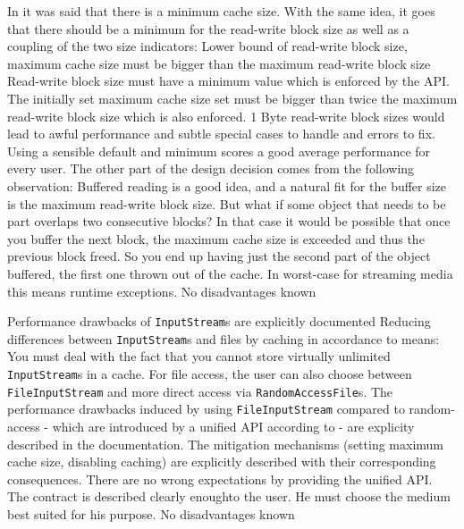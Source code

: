 In  it was said that there is a minimum cache size. With the same idea, it goes that there should be a minimum for the read-write block size as well as a coupling of the two size indicators:
{%
Lower bound of read-write block size, maximum cache size must be bigger than the maximum read-write block size
}
{%
Read-write block size must have a minimum value which is enforced by the API. The initially set maximum cache size set must be bigger than twice the maximum read-write block size which is also enforced.
}
{%
1 Byte read-write block sizes would lead to awful performance and subtle special cases to handle and errors to fix. Using a sensible default and minimum scores a good average performance for every user. The other part of the design decision comes from the following observation: Buffered reading is a good idea, and a natural fit for the buffer size is the maximum read-write block size. But what if some object that needs to be part overlaps two consecutive blocks? In that case it would be possible that once you buffer the next block, the maximum cache size is exceeded and thus the previous block freed. So you end up having just the second part of the object buffered, the first one thrown out of the cache. In worst-case for streaming media this means runtime exceptions.
}
{%
No disadvantages known
}

{%
Performance drawbacks of \texttt{InputStream}s are explicitly documented
}
{%
Reducing differences between \texttt{InputStream}s and files by caching in accordance to  means: You must deal with the fact that you cannot store virtually unlimited \texttt{InputStream}s in a cache. For file access, the user can also choose between \texttt{FileInputStream} and more direct access via \texttt{RandomAccessFile}s. The performance drawbacks induced by using \texttt{FileInputStream} compared to  random-access \-- which are introduced by a unified API according to  \-- are explicity described in the \LibName{} documentation. The mitigation mechanisms (setting maximum cache size, disabling caching) are explicitly described with their corresponding consequences.
}
{%
There are no wrong expectations by providing the unified API. The contract is described clearly enoughto the user. He must choose the medium best suited for his purpose.
}
{%
No disadvantages known
}

